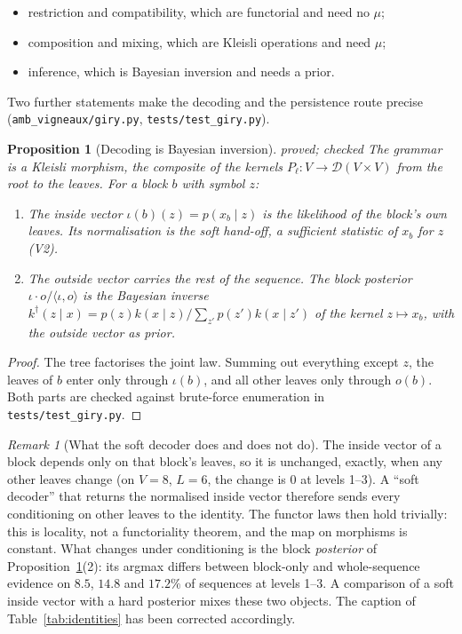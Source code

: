 \documentclass[11pt]{article}
\newtheorem{proposition}[theorem]{Proposition}
\theoremstyle{definition}
\theoremstyle{remark}
\newtheorem{remark}[theorem]{Remark}
\newcommand{\st}[1]{\textsf{\small\color{gray}#1}}
\begin{document}
\begin{itemize}
  \item restriction and compatibility, which are functorial and need no $\mu$;
  \item composition and mixing, which are Kleisli operations and need $\mu$;
  \item inference, which is Bayesian inversion and needs a prior.
\end{itemize}

Two further statements make the decoding and the persistence route precise (\texttt{amb\_vigneaux/giry.py}, \texttt{tests/test\_giry.py}).

\begin{proposition}[Decoding is Bayesian inversion]\label{prop:bayesinv}\st{proved; checked}
The grammar is a Kleisli morphism, the composite of the kernels $P_\ell:V\to\mathcal D(V\times V)$ from the root to the leaves. For a block $b$ with symbol $z$:
\begin{enumerate}
  \item The inside vector $\iota(b)(z)=p(x_b\mid z)$ is the likelihood of the block's \emph{own} leaves. Its normalisation is the soft hand-off, a sufficient statistic of $x_b$ for $z$ (V2).
  \item The outside vector carries the rest of the sequence. The block posterior $\iota\cdot o/\langle\iota,o\rangle$ is the Bayesian inverse $k^\dagger(z\mid x)=p(z)k(x\mid z)/\sum_{z'}p(z')k(x\mid z')$ of the kernel $z\mapsto x_b$, with the outside vector as prior.
\end{enumerate}
\end{proposition}
\begin{proof}
The tree factorises the joint law. Summing out everything except $z$, the leaves of $b$ enter only through $\iota(b)$, and all other leaves only through $o(b)$. Both parts are checked against brute-force enumeration in \texttt{tests/test\_giry.py}.
\end{proof}

\begin{remark}[What the soft decoder does and does not do]\label{rem:softdecoder}
The inside vector of a block depends only on that block's leaves, so it is unchanged, exactly, when any other leaves change (on $V=8$, $L=6$, the change is $0$ at levels 1--3). A ``soft decoder'' that returns the normalised inside vector therefore sends every conditioning on other leaves to the identity. The functor laws then hold trivially: this is locality, not a functoriality theorem, and the map on morphisms is constant. What changes under conditioning is the block \emph{posterior} of Proposition~\ref{prop:bayesinv}(2): its argmax differs between block-only and whole-sequence evidence on $8.5$, $14.8$ and $17.2\%$ of sequences at levels 1--3. A comparison of a soft inside vector with a hard posterior mixes these two objects. The caption of Table~\ref{tab:identities} has been corrected accordingly.
\end{remark}
\end{document}

